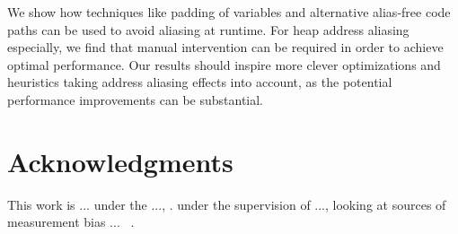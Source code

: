 \documentclass[10pt, conference, compsocconf]{IEEEtran}
\begin{document}
We show how techniques like padding of variables and alternative alias-free code paths can be used to avoid aliasing at runtime.
For heap address aliasing especially, we find that manual intervention can be required in order to achieve optimal performance.
Our results should inspire more clever optimizations and heuristics taking address aliasing effects into account, as the potential performance improvements can be substantial.

\section{Acknowledgments}
\iffalse
This work is forked from a Master's thesis project under the supervision of Anne Cathrine Elster and Rune Erlend Jensen, looking at sources of measurement bias on the Intel ``Ivy Bridge'' microarchitecture~\cite{MasterThesis}.
\fi
This work is ... under the ..., .
 under the supervision of ..., looking at sources of measurement bias ... ~\cite{MasterThesis}.





\end{document}
